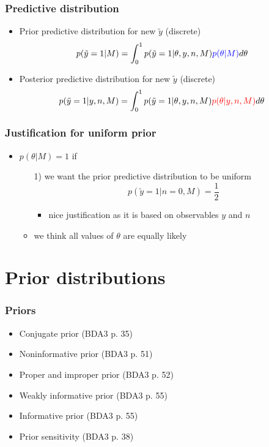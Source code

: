 \documentclass[10pt]{beamer}
\begin{document}
\begin{frame}
  \frametitle{Predictive distribution}

  \begin{itemize}
  \item {\color{blue} Prior predictive} distribution for new $\tilde{y}$ (discrete)
    \begin{align*}
      p(\tilde{y}=1|M) &= \int_0^1 p(\tilde{y}=1|\theta,y,n,M){\color{blue}p(\theta|M)}d\theta
    \end{align*}
  \item {\color{red} Posterior predictive} distribution for new $\tilde{y}$ (discrete)
    \begin{align*}
      p(\tilde{y}=1|y,n,M) &= \int_0^1 p(\tilde{y}=1|\theta,y,n,M){\color{red}p(\theta|y,n,M)}d\theta
    \end{align*}
  \end{itemize}
\end{frame}

\begin{frame}
  \frametitle{Justification for uniform prior}

  \begin{itemize}
  \item $p(\theta|M)=1$ if
    \begin{itemize}
    \item[1)] we want the prior predictive distribution to be uniform
      \begin{equation*}
        p(\tilde{y}=1|n=0,M) = \frac{1}{2}
      \end{equation*}
      \begin{itemize}
      \item nice justification as it is based on observables $y$ and $n$
      \end{itemize}
     \item<2->[2)] we think all values of $\theta$ are equally likely
    \end{itemize}
  \end{itemize}

\end{frame}

\section{Prior distributions}

\begin{frame}
  \frametitle{Priors}

  \begin{itemize}
  \item Conjugate prior (BDA3 p. 35)
  \item Noninformative prior (BDA3 p. 51)
  \item Proper and improper prior (BDA3 p. 52)
  \item Weakly informative prior (BDA3 p. 55)
  \item Informative prior (BDA3 p. 55)
  \item Prior sensitivity (BDA3 p. 38)
  \end{itemize}

\end{frame}
\end{document}
